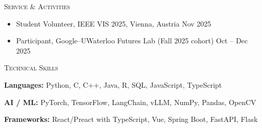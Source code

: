 \documentclass[11pt]{article}
\newcommand{\cvsection}[1]{%
  \par\vspace{1em}%
  {\noindent\large\scshape\color{accent}#1\par}%
  \vspace{-0.6em}\noindent{\color{rulegray}\rule{\textwidth}{0.6pt}}\par
  \vspace{0.3em}%
}
\begin{document}
\cvsection{Service \& Activities}
\begin{itemize}
  \item Student Volunteer, IEEE VIS 2025, Vienna, Austria \hfill {\small\color{mutedgray}Nov 2025}
  \item Participant, Google--UWaterloo Futures Lab (Fall 2025 cohort) \hfill {\small\color{mutedgray}Oct -- Dec 2025}
\end{itemize}

\cvsection{Technical Skills}
\noindent\textbf{Languages:} Python, C, C++, Java, R, SQL, JavaScript, TypeScript\par
\vspace{0.15em}
\noindent\textbf{AI / ML:} PyTorch, TensorFlow, LangChain, vLLM, NumPy, Pandas, OpenCV\par
\vspace{0.15em}
\noindent\textbf{Frameworks:} React/Preact with TypeScript, Vue, Spring Boot, FastAPI, Flask\par
\end{document}
